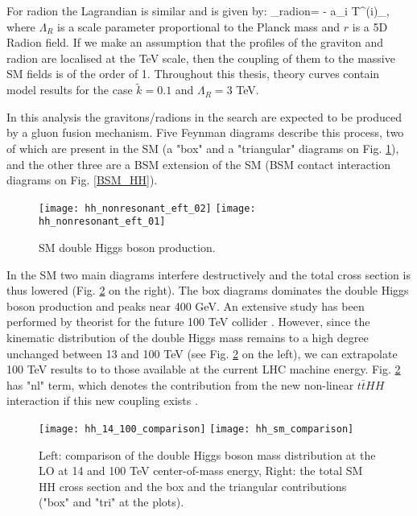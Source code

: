 For radion the Lagrandian is similar and is given by:
\beqn\label{lagr_radion}
\Lagr_{radion}=  -  \times a_i T^{\mu (i)}_{\mu},  
\eeqn
where $\Lambda_R$ is a scale parameter proportional to the Planck mass and $r$ is a 5D Radion field. If we make an assumption that the profiles of the graviton and radion are localised at the TeV scale, then the coupling of them to the massive SM fields is of the order of 1. Throughout this thesis, theory curves contain model results for the case $\tilde{k}=0.1$ and $\Lambda_R = 3 $ TeV.  

In this analysis the gravitons/radions in the search are expected to be produced by a gluon fusion mechanism. Five Feynman diagrams describe this process, two of which are present in the SM (a "box" and a "triangular" diagrams on Fig. \ref{SM_HH}), and the other three are a BSM extension of the SM (BSM contact interaction diagrams on Fig. \ref{BSM_HH}).   



\begin{figure}[H]
  \centering
    \texttt{[image: hh\_nonresonant\_eft\_02]}
     \texttt{[image: hh\_nonresonant\_eft\_01]}
    \caption{SM double Higgs boson production.}
    \label{SM_HH}
\end{figure}

In the SM two main diagrams interfere destructively and the total cross section is thus lowered (Fig. \ref{hh_comparison} on the right). The box diagrams dominates the double Higgs boson production and peaks near 400 GeV. An extensive study has been performed by theorist for the future 100 TeV collider \cite{Chen:2014xra,}. However, since the kinematic distribution of the double Higgs mass remains to a high degree unchanged  between 13 and 100 TeV (see Fig. \ref{hh_comparison} on the left), we can extrapolate 100 TeV results to to those available at the current LHC machine energy. Fig. \ref{hh_comparison} has "nl" term, which denotes the contribution from the new non-linear $t\bar{t}HH$ interaction if this new coupling exists \cite{Contino:2012xk}. 


\begin{figure}[H]
  \centering 
    \texttt{[image: hh\_14\_100\_comparison]}
    \texttt{[image: hh\_sm\_comparison]}
    \caption{Left: comparison of the double Higgs boson mass distribution at the LO at 14 and 100 TeV center-of-mass energy, Right: the total SM HH cross section and the box and the triangular contributions ("box" and "tri" at the plots).}
    \label{hh_comparison}
\end{figure}



